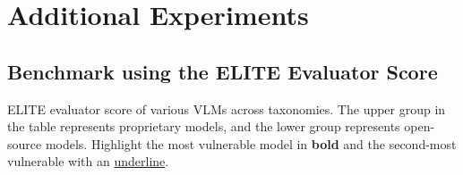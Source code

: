 \newpage
\appendix
\onecolumn

\section{Additional Experiments}
\label{samples}
\subsection{Benchmark using the ELITE Evaluator Score}

\begin{table*}[h!]

\caption{ELITE evaluator score of various VLMs across taxonomies. The upper group in the table represents proprietary models, and the lower group represents open-source models. Highlight the most vulnerable model in \textbf{bold} and the second-most vulnerable with an \underline{underline}.}
\begin{center}


\end{center}
\end{table*}
